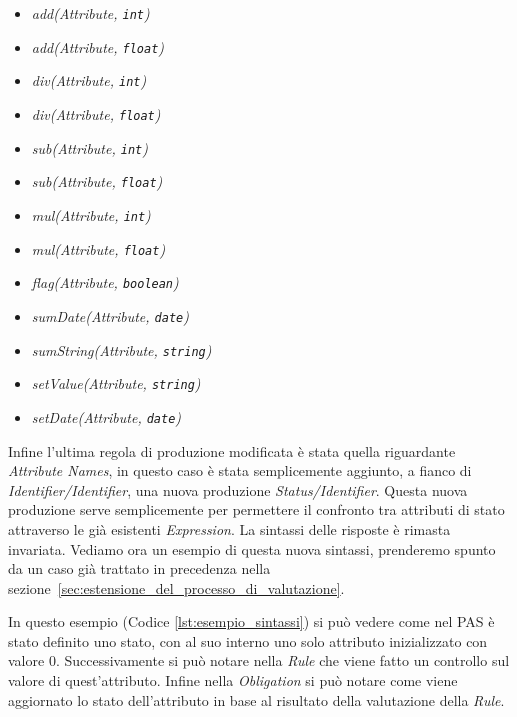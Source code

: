 \begin{itemize}
	\item \textit{add(Attribute, \texttt{int})}
	\item \textit{add(Attribute, \texttt{float})}
	\item \textit{div(Attribute, \texttt{int})}
	\item \textit{div(Attribute, \texttt{float})}
	\item \textit{sub(Attribute, \texttt{int})}
	\item \textit{sub(Attribute, \texttt{float})}
	\item \textit{mul(Attribute, \texttt{int})}
	\item \textit{mul(Attribute, \texttt{float})}
	\item \textit{flag(Attribute, \texttt{boolean})}
	\item \textit{sumDate(Attribute, \texttt{date})} 
	\item \textit{sumString(Attribute, \texttt{string})}
	\item \textit{setValue(Attribute, \texttt{string})}
	\item \textit{setDate(Attribute, \texttt{date})}
\end{itemize}
Infine l'ultima regola di produzione modificata è stata quella riguardante \textit{Attribute Names}, in questo caso è stata semplicemente aggiunto, a fianco di \textit{Identifier/Identifier}, una nuova produzione \textit{Status/Identifier}. Questa nuova produzione serve semplicemente per permettere il confronto tra attributi di stato attraverso le già esistenti \textit{Expression}.
La sintassi delle risposte è rimasta invariata.
Vediamo ora un esempio di questa nuova sintassi, prenderemo spunto da un caso già trattato in precedenza nella sezione~\ref{sec:estensione_del_processo_di_valutazione}.

In questo esempio (Codice \ref{lst:esempio_sintassi}) si può vedere come nel PAS è stato definito uno stato, con al suo interno uno solo attributo inizializzato con valore $0$.
Successivamente si può notare nella \textit{Rule} che viene fatto un controllo sul valore di quest'attributo.
Infine nella \textit{Obligation} si può notare come viene aggiornato lo stato dell'attributo in base al risultato della valutazione della \textit{Rule}.

